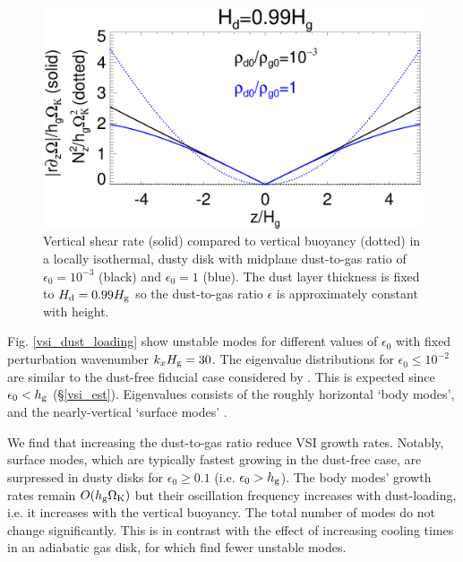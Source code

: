 \begin{figure}
  \includegraphics[width=\linewidth]{figures/compare_vshear_Nz2_fixHd} 
  \caption{Vertical shear rate (solid) compared to vertical buoyancy
    (dotted) in a locally isothermal, dusty disk with midplane dust-to-gas ratio
    of $\epsilon_0=10^{-3}$ (black) and $\epsilon_0=1$ (blue). 
    The dust layer thickness is fixed to $H_\mathrm{d}=0.99H_\mathrm{g}$ so the 
    dust-to-gas ratio $\epsilon$ is approximately constant with
    height. 
    \label{compare_vshear_fixHd}
    }
\end{figure}

Fig. \ref{vsi_dust_loading} show unstable modes for different values
of $\epsilon_0$ with fixed perturbation wavenumber  $k_xH_\mathrm{g} = 30$. The
eigenvalue distributions for $\epsilon_0 \leq 10^{-2}$ are similar to the
dust-free fiducial case considered by . This is
expected since $\epsilon_0 < h_\mathrm{g}$ (\S\ref{vsi_est}). Eigenvalues 
consists 
of the roughly horizontal `body modes', and the nearly-vertical
`surface modes' \citep[which are associated with the imposed vertical
boundaries, ][]{barker15}.   

We find that increasing the dust-to-gas ratio reduce VSI growth
rates. Notably, surface modes, which are typically fastest growing in
the dust-free case, are surpressed in dusty disks for $\epsilon_0\geq
0.1$ (i.e. $\epsilon_0> h_\mathrm{g}$).   
The body modes' growth rates remain $ O(h_\mathrm{g}\Omega_{\rm K})$ 
but their oscillation frequency increases with
dust-loading, i.e. it increases with the vertical buoyancy. 
The total number of modes do not change 
significantly. This is in contrast with the effect of increasing
cooling times in an adiabatic gas disk, for which 
find fewer unstable modes. 

